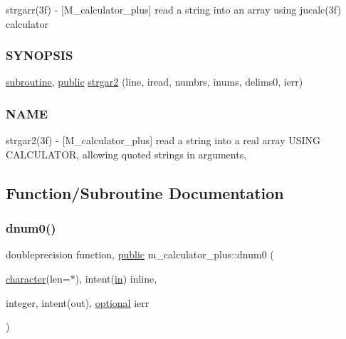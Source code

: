 \begin{DoxyCompactItemize}
\begin{DoxyCompactList}
strgarr(3f) -\/ \mbox{[}M\+\_\+calculator\+\_\+plus\mbox{]} read a string into an array using jucalc(3f) calculator \subsubsection*{S\+Y\+N\+O\+P\+S\+IS}\end{DoxyCompactList}\item 
\hyperlink{M__stopwatch_83_8txt_acfbcff50169d691ff02d4a123ed70482}{subroutine}, \hyperlink{M__stopwatch_83_8txt_a2f74811300c361e53b430611a7d1769f}{public} \hyperlink{namespacem__calculator__plus_a59710eb6babeed1f4b8d439f97d5d90a}{strgar2} (line, iread, numbrs, inums, delims0, ierr)
\begin{DoxyCompactList}\small\item\em \subsubsection*{N\+A\+ME}

strgar2(3f) -\/ \mbox{[}M\+\_\+calculator\+\_\+plus\mbox{]} read a string into a real array U\+S\+I\+NG C\+A\+L\+C\+U\+L\+A\+T\+OR, allowing quoted strings in arguments, \end{DoxyCompactList}\end{DoxyCompactItemize}


\subsection{Function/\+Subroutine Documentation}
\mbox{\label{namespacem__calculator__plus_add45c0bb36bc796ee8a0354665f9397e}} 
\subsubsection{\texorpdfstring{dnum0()}{dnum0()}}
{\footnotesize\ttfamily doubleprecision function, \hyperlink{M__stopwatch_83_8txt_a2f74811300c361e53b430611a7d1769f}{public} m\+\_\+calculator\+\_\+plus\+::dnum0 (\begin{DoxyParamCaption}\item[{\hyperlink{option__stopwatch_83_8txt_abd4b21fbbd175834027b5224bfe97e66}{character}(len=$\ast$), intent(\hyperlink{M__journal_83_8txt_afce72651d1eed785a2132bee863b2f38}{in})}]{inline,  }\item[{integer, intent(out), \hyperlink{option__stopwatch_83_8txt_aa4ece75e7acf58a4843f70fe18c3ade5}{optional}}]{ierr }\end{DoxyParamCaption})}



